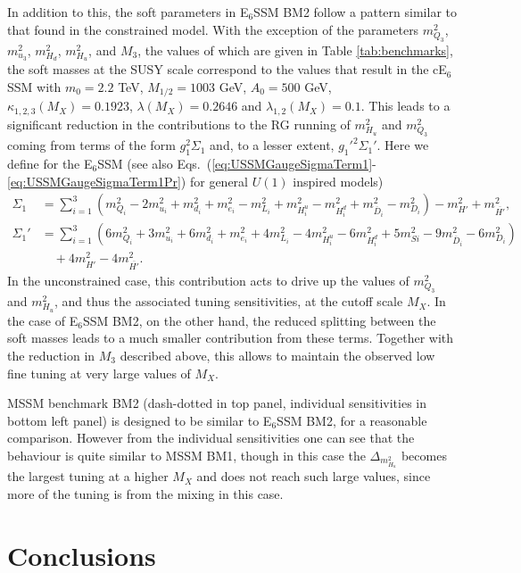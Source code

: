 \documentclass[preprint,amsmath,amssymb,aps,superscriptaddress,prd,showpacs,floatfix,nofootinbib]{revtex4-1}
\begin{document}
In addition to this, the soft parameters in E$_6$SSM BM2 follow a pattern similar to that found in the constrained
model. With the exception of the parameters $m_{Q_3}^2$, 
$m_{u_3}^2$, $m_{H_d}^2$, $m_{H_u}^2$, and $M_3$, the values of which are given in Table \ref{tab:benchmarks}, 
the soft masses at the SUSY scale correspond to the values that result in the cE$_6$SSM with $m_0=2.2$ TeV, 
$M_{1/2}=1003$ GeV, $A_0=500$ GeV, $\kappa_{1,2,3}(M_X)=0.1923$, $\lambda(M_X)=0.2646$ and
$\lambda_{1,2}(M_X)=0.1$. This leads to a significant reduction in the contributions to the RG running of $m_{H_u}^2$ and $m_{Q_3}^2$ coming from terms of the form $g_1^2\Sigma_1$ and, to a lesser extent, $g_1'^2\Sigma_1'$. Here we define for the E$_6$SSM (see also Eqs.~(\ref{eq:USSMGaugeSigmaTerm1}-\ref{eq:USSMGaugeSigmaTerm1Pr}) for general $U(1)$ inspired models)
\begin{align*}
\Sigma_1&=\sum_{i=1}^3\left ( m_{Q_i}^2-2m_{u_i}^2+m_{d_i}^2+m_{e_i}^2-m_{L_i}^2+m_{H_i^u}^2-m_{H_i^d}^2+m_{\overline{D}_i}^2-m_{D_i}^2\right )-m_{H'}^2+m_{\overline{H'}}^2,\\
\Sigma_1'&=\sum_{i=1}^3\left ( 6m_{Q_i}^2+3m_{u_i}^2+6m_{d_i}^2+m_{e_i}^2+4m_{L_i}^2-4m_{H_i^u}^2-6m_{H_i^d}^2+5m_{Si}^2-9m_{\overline{D}_i}^2-6m_{D_i}^2\right )\\
&\quad{}+4m_{H'}^2-4m_{\overline{H'}}^2.
\end{align*}
In the unconstrained case, this contribution acts to drive up the values of $m_{Q_3}^2$ and $m_{H_u}^2$, and thus the associated tuning sensitivities, at the cutoff scale $M_X$. In the case of E$_6$SSM BM2, on the other hand, the reduced splitting between the soft masses leads to a much smaller contribution from these terms. Together with the reduction in $M_3$ described above, this allows to maintain the observed low fine tuning at very large values of $M_X$.

MSSM benchmark BM2 (dash-dotted in top panel, individual sensitivities in bottom left panel) is designed to be similar to E$_6$SSM BM2, for a reasonable comparison.  However from the individual sensitivities one can see that the behaviour is quite similar to MSSM BM1, though in this case the $\Delta_{m_{H_u}^2}$ becomes the largest tuning at a higher $M_X$ and does not reach such large values, since more of the tuning is from the mixing in this case.

\section{\label{sec:conclusion}Conclusions}
\end{document}
